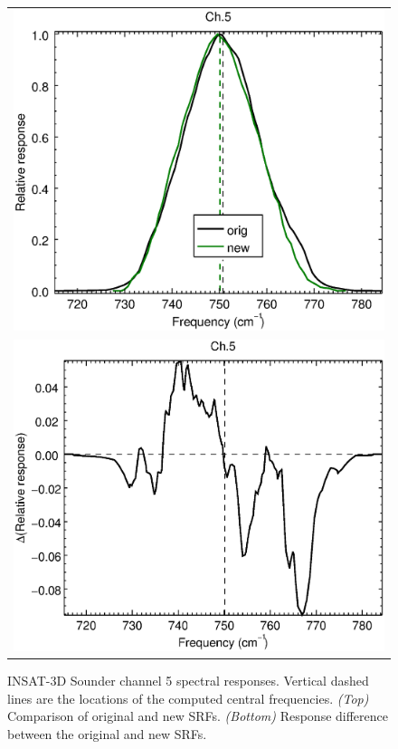 \begin{figure}[H]
  \centering
  \begin{tabular}{c}
    \includegraphics[scale=0.55]{graphics/sndr/srf/sndr_insat3d-5.eps} \\
    \includegraphics[scale=0.55]{graphics/sndr/srf/sndr_insat3d-5.difference.eps}
  \end{tabular}
  \caption{INSAT-3D Sounder channel 5 spectral responses. Vertical dashed lines are the locations of the computed central frequencies. \emph{(Top)} Comparison of original and new SRFs. \emph{(Bottom)} Response difference between the original and new SRFs.}
  \label{fig:sndr_ch5}
\end{figure}


